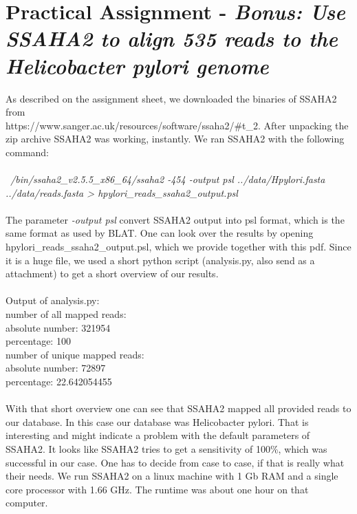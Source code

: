 \documentclass[%
   10pt,              %
   nenglish,           %
   a4paper,           %
   DIV11,             %
]{scrartcl}%
\begin{document}
\section*{Practical Assignment - \textsl{Bonus: Use SSAHA2 to align 535 reads to the Helicobacter pylori genome}}
 
As described on the assignment sheet, we downloaded the binaries of SSAHA2 from \\
https://www.sanger.ac.uk/resources/software/ssaha2/\#t\_2. After unpacking the zip archive SSAHA2 was
working, instantly. We ran SSAHA2 with the following command: \\
\\
\textit{~/bin/ssaha2\_v2.5.5\_x86\_64/ssaha2 -454 -output psl  ../data/Hpylori.fasta ../data/reads.fasta > hpylori\_reads\_ssaha2\_output.psl} \\
\\
The parameter \textit{-output psl} convert SSAHA2 output into psl format, which is the same format 
as used by BLAT.
One can look over the results by opening hpylori\_reads\_ssaha2\_output.psl, which we provide together 
with this pdf. Since it is a huge file, we used a short python script (analysis.py, also send as a 
attachment) to get a short overview of our results. \\
\\
Output of analysis.py:\\
\indent number of all mapped reads:\\ 
    \indent\indent absolute number:  321954\\
    \indent\indent percentage:  100\\
\indent number of unique mapped reads:\\ 
    \indent\indent absolute number: 72897\\
    \indent\indent percentage:  22.642054455\\
\\
With that short overview one can see that SSAHA2 mapped all provided reads to our database. In 
this case our database was Helicobacter pylori. That is interesting and might indicate a problem with
the default parameters of SSAHA2. It looks like SSAHA2 tries to get a sensitivity of 100\%, which 
was successful in our case. One has to decide from case to case, if that is really what their needs.
We run SSAHA2 on a linux machine with 1 Gb RAM and a single core processor with 1.66 GHz. The runtime
was about one hour on that computer.

 
\end{document}
